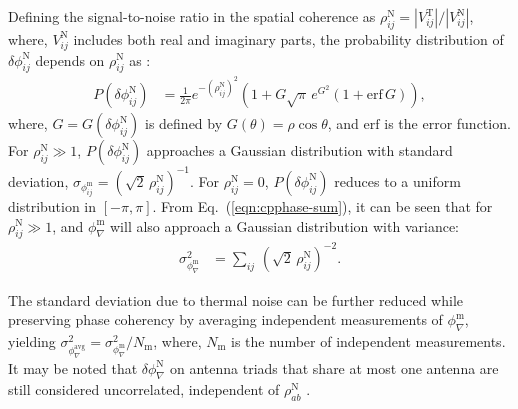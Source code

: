 \documentclass[
reprint,
superscriptaddress,
amsmath,
amssymb,
aps,
prd
]{revtex4-1}
\begin{document}
Defining the signal-to-noise ratio in the spatial coherence as $\rho_{ij}^\textrm{N} = |V_{ij}^\textrm{T}|/|V_{ij}^\textrm{N}|$, where, $V_{ij}^\textrm{N}$ includes both real and imaginary parts, the probability distribution of $\delta\phi_{ij}^\textrm{N}$ depends on $\rho_{ij}^\textrm{N}$ as \cite{cra89}:
\begin{align}
  P(\delta\phi_{ij}^\textrm{N}) &= \frac{1}{2\pi} e^{-(\rho_{ij}^\textrm{N})^2} \left(1 + G\sqrt{\pi}\,e^{G^2}(1+\mathrm{erf}\,G)\right),
\end{align}
where, $G=G(\delta\phi_{ij}^\textrm{N})$ is defined by $G(\theta)=\rho\cos\theta$, and $\mathrm{erf}$ is the error function. For $\rho_{ij}^\textrm{N}\gg 1$, $P(\delta\phi_{ij}^\textrm{N})$ approaches a Gaussian distribution with standard deviation, $\sigma_{\phi_{ij}^\textrm{m}} = (\sqrt{2}\,\rho_{ij}^\textrm{N})^{-1}$.
For $\rho_{ij}^\textrm{N}=0$, $P(\delta\phi_{ij}^\textrm{N})$ reduces to a uniform distribution in $[-\pi,\pi]$. From Eq.~(\ref{eqn:cpphase-sum}), it can be seen that for $\rho_{ij}^\textrm{N}\gg 1$, and $\phi_\nabla^\textrm{m}$ will also approach a Gaussian distribution with variance:
\begin{align}
  \sigma_{\phi_\nabla^\textrm{m}}^2 &= \sum_{ij}\,(\sqrt{2}\,\rho_{ij}^\textrm{N})^{-2}. \label{eqn:cprms-noise}
\end{align}


The standard deviation due to thermal noise can be further reduced while preserving phase coherency by averaging independent measurements of $\phi_\nabla^\textrm{m}$, yielding $\sigma_{\phi_\nabla^\textrm{avg}}^2 = \sigma_{\phi_\nabla^\textrm{m}}^2 / N_\textrm{m}$,
where, $N_\textrm{m}$ is the number of independent measurements. It may be noted that $\delta\phi_\nabla^\textrm{N}$ on antenna triads that share at most one antenna are still considered uncorrelated, independent of $\rho_{ab}^\textrm{N}$ \cite{kul89}.
\end{document}
